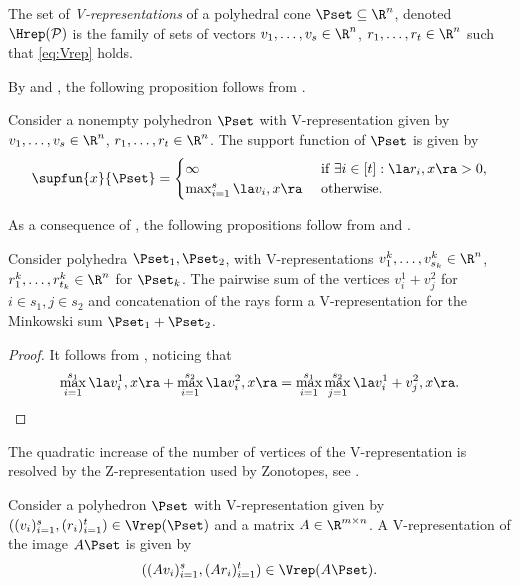 \documentclass[11pt,twoside,a4paper,openright]{uclouvain-thesis}
\begin{document}
\begin{mydef}
  The set of \emph{V-representations} of a polyhedral cone $\Pset \subseteq \R^n$,
  denoted $\Hrep(\mathcal{P})$ is the family of sets of
  vectors $v_1, \ldots, v_s \in \R^n$, $r_1, \ldots, r_t \in \R^n$
  such that \eqref{eq:Vrep} holds.
\end{mydef}

By  and ,
the following proposition follows from .

\begin{myprop}
  \label{prop:supfunvrep}
  Consider a nonempty polyhedron $\Pset$ with V-representation given by
  $v_1, \ldots, v_s \in \R^n$, $r_1, \ldots, r_t \in \R^n$.
  The support function of $\Pset$ is given by
  \begin{equation*}
    \supfun{x}{\Pset} =
    \begin{cases}
      \infty & \text{ if } \exists i \in [t]: \la r_i, x \ra > 0,\\
      \max_{i=1}^s \la v_i, x \ra & \text{ otherwise}.
    \end{cases}
  \end{equation*}
\end{myprop}


As a consequence of , the following propositions follow from  and .
\begin{myprop}
  \label{prop:polysum}
  Consider polyhedra $\Pset_1, \Pset_2$, with V-representations
  $v_1^k, \ldots, v_{s_k}^k \in \R^n$, $r_1^k, \ldots, r_{t_k}^k \in \R^n$ for $\Pset_k$.
  The pairwise sum of the vertices $v_i^1 + v_j^2$ for $i \in s_1, j \in s_2$
  and concatenation of the rays form a V-representation
  for the Minkowski sum $\Pset_1 + \Pset_2$.
  \begin{proof}
    It follows from , noticing that
    \[
      \max_{i=1}^{s_1} \la v_i^1, x \ra + \max_{i=1}^{s_2} \la v_i^2, x \ra
      = \max_{i=1}^{s_1} \max_{j=1}^{s_2} \la v_i^1 + v_j^2, x \ra.
    \]
  \end{proof}
\end{myprop}
The quadratic increase of the number of vertices of the V-representation
is resolved by the Z-representation used by Zonotopes, see .

\begin{myprop}
  \label{prop:hApolyhedron}
  Consider a polyhedron $\Pset$ with V-representation given by
  $((v_i)_{i=1}^s, (r_i)_{i=1}^t) \in \Vrep(\Pset)$
  and a matrix $A \in \R^{m \times n}$.
  A V-representation of the image $A\Pset$ is given by
  \begin{equation*}
    ((Av_i)_{i=1}^s, (Ar_i)_{i=1}^t) \in \Vrep(A\Pset).
  \end{equation*}
\end{myprop}
\end{document}
